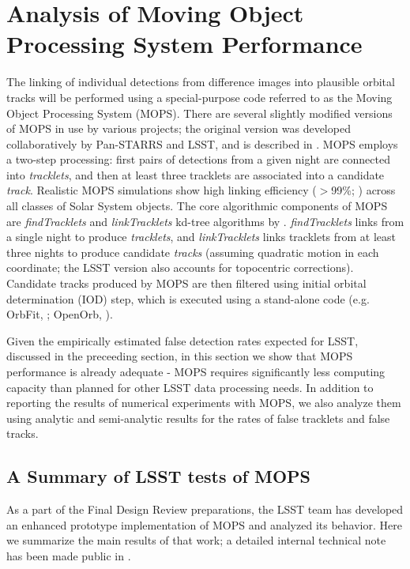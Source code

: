 
\section{Analysis of Moving Object Processing System Performance \label{sec:mops}}


The linking of individual detections from difference images into plausible orbital tracks will be performed using
a special-purpose code referred to as the Moving Object Processing System (MOPS). There are several slightly modified
versions of MOPS in use by various projects; the original version was developed collaboratively by Pan-STARRS
and LSST, and is described in \cite{denneau13}. MOPS employs a two-step processing: first pairs of detections
from a given night are connected into {\it tracklets}, and then at least three tracklets are associated into a
candidate {\it track}. Realistic MOPS simulations show high linking efficiency ($>$99\%; \citealt{denneau13})
across all classes of Solar System objects. The core algorithmic components of MOPS are {\it findTracklets} and
{\it linkTracklets} kd-tree algorithms by \citet{kubica07}. {\it findTracklets} links \DIASources from a single
night to produce {\it tracklets}, and {\it linkTracklets} links tracklets from at least three nights to produce candidate
{\it tracks} (assuming quadratic motion in each coordinate; the LSST version also accounts for topocentric
corrections). Candidate tracks produced by MOPS are then filtered using initial orbital determination (IOD) step,
which is executed using a stand-alone code (e.g. OrbFit, \citealt{milani08}; OpenOrb, \citealt{OpenOrb2009}).

Given the empirically estimated false detection rates expected for LSST, discussed in the preceeding section,
in this section we show that MOPS performance is already adequate - MOPS requires significantly less
computing capacity than planned for other LSST data processing needs. In addition to reporting the results of
numerical experiments with MOPS, we also analyze them using analytic and semi-analytic results for the
rates of false tracklets and false tracks.




\subsection{A Summary of LSST tests of MOPS}

As a part of the Final Design Review preparations, the LSST team has developed an enhanced prototype
implementation of MOPS and analyzed its behavior. Here we summarize the main results of that work;
a detailed internal technical note has been made public in \cite{LDM-156}.

